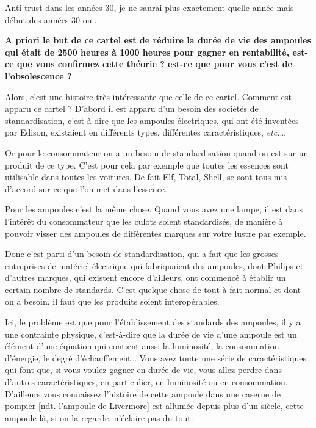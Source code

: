 \begin{small}
Anti-trust dans les années 30, je ne saurai plus exactement quelle année mais début des années 30 oui. 


\smallbreak\textbf{A priori le but de ce cartel est de réduire la durée de vie des ampoules qui était de 2500 heures à 1000 heures pour gagner en rentabilité, est-ce que vous confirmez cette théorie ? est-ce que pour vous c'est de l'obsolescence ?}\smallbreak

Alors, c'est une histoire très intéressante que celle de ce cartel. Comment est apparu ce cartel ? D'abord il est apparu d'un besoin des sociétés de standardisation, c'est-à-dire que les ampoules électriques, qui ont été inventées par Edison, existaient en différents types, différentes caractéristiques, \textit{etc.}\dots


Or pour le consommateur on a un besoin de standardisation quand on est sur un produit de ce type. C'est pour cela par exemple que toutes les essences sont utilisable dans toutes les voitures.
De fait Elf, Total, Shell, se sont tous mis d'accord sur ce que l'on met dans l'essence. 

Pour les ampoules c'est la même chose. Quand vous avez une lampe, il est dans l'intérêt du consommateur que les culots soient standardisés, de manière à pouvoir visser des ampoules de différentes marques sur votre lustre par exemple.

\smallbreak

Donc c'est parti d'un besoin de standardisation, qui a fait que les grosses entreprises de matériel électrique qui fabriquaient des ampoules,  dont Philips et d'autres marques, qui existent encore d'ailleurs, ont commencé à établir un certain nombre de standards.
C'est quelque chose de tout à fait normal et dont on a besoin, il faut que les produits soient interopérables.

\smallbreak

Ici, le problème est que pour l'établissement des standards des ampoules, il y a une contrainte physique, c'est-à-dire que la durée de vie d'une ampoule est un élément d'une équation qui contient aussi la luminosité, la consommation d'énergie, le degré d'échauffement\dots
Vous avez toute une série de caractéristiques qui font que, si vous voulez gagner en durée de vie, vous allez perdre dans d'autres caractéristiques, en particulier, en luminosité ou en consommation. D'ailleurs vous connaissez l'histoire de cette ampoule dans une caserne de pompier [ndt. l'ampoule de Livermore] est allumée depuis plus d'un siècle, cette ampoule là, si on la regarde, n'éclaire pas du tout.


\end{small}
